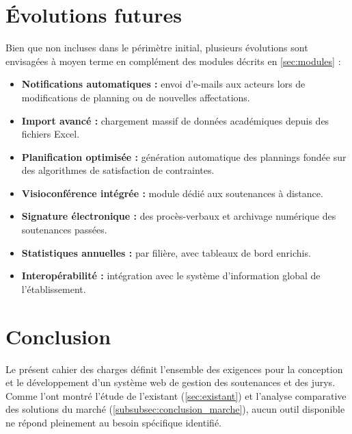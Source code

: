 \documentclass[12pt,a4paper]{article}
\begin{document}
\section{Évolutions futures}
\label{sec:evolutions}

Bien que non incluses dans le périmètre initial, plusieurs évolutions sont
envisagées à moyen terme en complément des modules décrits en \ref{sec:modules} :

\begin{itemize}[label=\textcolor{primary}{\textbullet}]
    \item \textbf{Notifications automatiques :} envoi d'e-mails aux acteurs lors
          de modifications de planning ou de nouvelles affectations.
    \item \textbf{Import avancé :} chargement massif de données académiques
          depuis des fichiers Excel.
    \item \textbf{Planification optimisée :} génération automatique des plannings
          fondée sur des algorithmes de satisfaction de contraintes.
    \item \textbf{Visioconférence intégrée :} module dédié aux soutenances à
          distance.
    \item \textbf{Signature électronique :} des procès-verbaux et archivage
          numérique des soutenances passées.
    \item \textbf{Statistiques annuelles :} par filière, avec tableaux de bord
          enrichis.
    \item \textbf{Interopérabilité :} intégration avec le système d'information
          global de l'établissement.
\end{itemize}

\section{Conclusion}
\label{sec:conclusion}

Le présent cahier des charges définit l'ensemble des exigences pour la
conception et le développement d'un système web de gestion des soutenances et
des jurys. Comme l'ont montré l'étude de l'existant (\ref{sec:existant}) et
l'analyse comparative des solutions du marché
(\ref{subsubsec:conclusion_marche}), aucun outil disponible ne répond
pleinement au besoin spécifique identifié.
\end{document}
